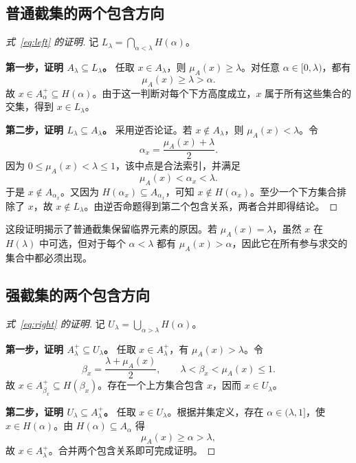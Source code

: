 \documentclass[UTF8,fontset=fandol,zihao=-4,a4paper]{ctexart}
\numberwithin{equation}{section}
\theoremstyle{reportplain}
\newcommand{\muA}{\mu_A}
\newcommand{\cut}[1]{A_{#1}}
\newcommand{\scut}[1]{A_{#1}^{+}}
\newcommand{\eqtag}[1]{\label{#1}}
\begin{document}
\subsection{普通截集的两个包含方向}
\begin{proof}[式~\eqref{eq:left} 的证明]
记 $L_\lambda=\bigcap_{\alpha<\lambda}H(\alpha)$。

\textbf{第一步，证明 $\cut{\lambda}\subseteq L_\lambda$。} 任取 $x\in\cut{\lambda}$，则 $\muA(x)\ge\lambda$。对任意 $\alpha\in[0,\lambda)$，都有
\begin{equation}
\muA(x)\ge\lambda>\alpha.
\eqtag{eq:left-in}
\end{equation}
故 $x\in\scut{\alpha}\subseteq H(\alpha)$。由于这一判断对每个下方高度成立，$x$ 属于所有这些集合的交集，得到 $x\in L_\lambda$。

\textbf{第二步，证明 $L_\lambda\subseteq\cut{\lambda}$。} 采用逆否论证。若 $x\notin\cut{\lambda}$，则 $\muA(x)<\lambda$。令
\begin{equation}
\alpha_x=\frac{\muA(x)+\lambda}{2}.
\eqtag{eq:left-mid}
\end{equation}
因为 $0\le\muA(x)<\lambda\le1$，该中点是合法索引，并满足
\begin{equation}
\muA(x)<\alpha_x<\lambda.
\eqtag{eq:left-witness}
\end{equation}
于是 $x\notin\cut{\alpha_x}$。又因为 $H(\alpha_x)\subseteq\cut{\alpha_x}$，可知 $x\notin H(\alpha_x)$。至少一个下方集合排除了 $x$，故 $x\notin L_\lambda$。由逆否命题得到第二个包含关系，两者合并即得结论。
\end{proof}

这段证明揭示了普通截集保留临界元素的原因。若 $\muA(x)=\lambda$，虽然 $x$ 在 $H(\lambda)$ 中可选，但对于每个 $\alpha<\lambda$ 都有 $\muA(x)>\alpha$，因此它在所有参与求交的集合中都必须出现。

\subsection{强截集的两个包含方向}
\begin{proof}[式~\eqref{eq:right} 的证明]
记 $U_\lambda=\bigcup_{\alpha>\lambda}H(\alpha)$。

\textbf{第一步，证明 $\scut{\lambda}\subseteq U_\lambda$。} 任取 $x\in\scut{\lambda}$，有 $\muA(x)>\lambda$。令
\begin{equation}
\beta_x=\frac{\lambda+\muA(x)}2,
\qquad\lambda<\beta_x<\muA(x)\le1.
\eqtag{eq:right-mid}
\end{equation}
故 $x\in\scut{\beta_x}\subseteq H(\beta_x)$。存在一个上方集合包含 $x$，因而 $x\in U_\lambda$。

\textbf{第二步，证明 $U_\lambda\subseteq\scut{\lambda}$。} 任取 $x\in U_\lambda$。根据并集定义，存在 $\alpha\in(\lambda,1]$，使 $x\in H(\alpha)$。由 $H(\alpha)\subseteq\cut{\alpha}$ 得
\begin{equation}
\muA(x)\ge\alpha>\lambda,
\eqtag{eq:right-out}
\end{equation}
故 $x\in\scut{\lambda}$。合并两个包含关系即可完成证明。
\end{proof}
\end{document}
